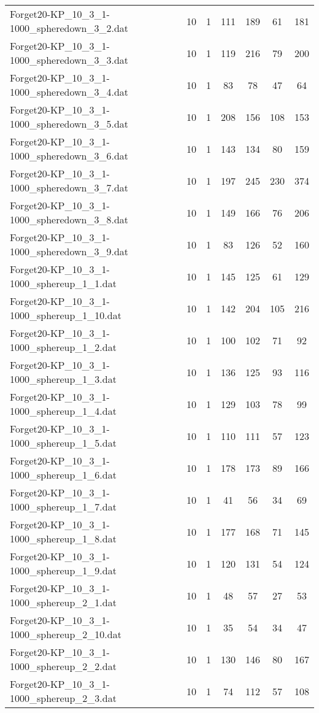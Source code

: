 \begin{table}[!ht]
\begin{tabular}{lcccccc}
Forget20-KP\_10\_3\_1-1000\_spheredown\_3\_2.dat & 10 & 1 & 111 & 189 & 61 & 181 \\
Forget20-KP\_10\_3\_1-1000\_spheredown\_3\_3.dat & 10 & 1 & 119 & 216 & 79 & 200 \\
Forget20-KP\_10\_3\_1-1000\_spheredown\_3\_4.dat & 10 & 1 & 83 & 78 & 47 & 64 \\
Forget20-KP\_10\_3\_1-1000\_spheredown\_3\_5.dat & 10 & 1 & 208 & 156 & 108 & 153 \\
Forget20-KP\_10\_3\_1-1000\_spheredown\_3\_6.dat & 10 & 1 & 143 & 134 & 80 & 159 \\
Forget20-KP\_10\_3\_1-1000\_spheredown\_3\_7.dat & 10 & 1 & 197 & 245 & 230 & 374 \\
Forget20-KP\_10\_3\_1-1000\_spheredown\_3\_8.dat & 10 & 1 & 149 & 166 & 76 & 206 \\
Forget20-KP\_10\_3\_1-1000\_spheredown\_3\_9.dat & 10 & 1 & 83 & 126 & 52 & 160 \\
Forget20-KP\_10\_3\_1-1000\_sphereup\_1\_1.dat & 10 & 1 & 145 & 125 & 61 & 129 \\
Forget20-KP\_10\_3\_1-1000\_sphereup\_1\_10.dat & 10 & 1 & 142 & 204 & 105 & 216 \\
Forget20-KP\_10\_3\_1-1000\_sphereup\_1\_2.dat & 10 & 1 & 100 & 102 & 71 & 92 \\
Forget20-KP\_10\_3\_1-1000\_sphereup\_1\_3.dat & 10 & 1 & 136 & 125 & 93 & 116 \\
Forget20-KP\_10\_3\_1-1000\_sphereup\_1\_4.dat & 10 & 1 & 129 & 103 & 78 & 99 \\
Forget20-KP\_10\_3\_1-1000\_sphereup\_1\_5.dat & 10 & 1 & 110 & 111 & 57 & 123 \\
Forget20-KP\_10\_3\_1-1000\_sphereup\_1\_6.dat & 10 & 1 & 178 & 173 & 89 & 166 \\
Forget20-KP\_10\_3\_1-1000\_sphereup\_1\_7.dat & 10 & 1 & 41 & 56 & 34 & 69 \\
Forget20-KP\_10\_3\_1-1000\_sphereup\_1\_8.dat & 10 & 1 & 177 & 168 & 71 & 145 \\
Forget20-KP\_10\_3\_1-1000\_sphereup\_1\_9.dat & 10 & 1 & 120 & 131 & 54 & 124 \\
Forget20-KP\_10\_3\_1-1000\_sphereup\_2\_1.dat & 10 & 1 & 48 & 57 & 27 & 53 \\
Forget20-KP\_10\_3\_1-1000\_sphereup\_2\_10.dat & 10 & 1 & 35 & 54 & 34 & 47 \\
Forget20-KP\_10\_3\_1-1000\_sphereup\_2\_2.dat & 10 & 1 & 130 & 146 & 80 & 167 \\
Forget20-KP\_10\_3\_1-1000\_sphereup\_2\_3.dat & 10 & 1 & 74 & 112 & 57 & 108 \\

\end{tabular}
\end{table}
